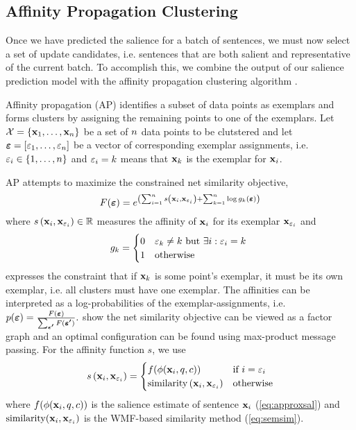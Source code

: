 \subsection{Affinity Propagation Clustering}
\label{sec:exsel}

Once we have predicted the salience for a batch of sentences, we must now
select a set of update candidates, i.e. sentences that are both salient and
representative of the current batch. To accomplish this, we combine the output
of our salience prediction model with the affinity propagation clustering
algorithm \citep{frey2007clustering}.

Affinity propagation (AP)  identifies a subset of data points as exemplars and
forms clusters by assigning the remaining points to one of the exemplars.  Let
$\mathcal{X} = \left\{\mathbf{x}_1,\ldots,\mathbf{x}_{n} \right\}$
be a set of $n$ data points to be clutstered and let $\boldsymbol{\varepsilon} =
\left[\varepsilon_1,\ldots, \varepsilon_{n} \right]$ be a vector of
corresponding exemplar assignments, i.e. $\varepsilon_i \in \{1,\ldots,
n\}$ and $\varepsilon_i = k$ means that $\mathbf{x}_k$ is the
exemplar for $\mathbf{x}_i$.

AP attempts to maximize the constrained net similarity 
objective,
\[ F(\mathbf{\boldsymbol{\varepsilon}}) = e^{\left(\sum_{i=1}^{n} s\left(\mathbf{x}_i,\mathbf{x}_{\varepsilon_i}\right) + \sum_{k=1}^{n} \log g_k(\mathbf{\boldsymbol{\varepsilon}}) \right)}
\]
where $s\left(\mathbf{x}_i, \mathbf{x}_{\varepsilon_i}\right) \in \mathbb{R}$ measures the 
affinity of $\mathbf{x}_i$ for its exemplar $\mathbf{x}_{\varepsilon_i}$ and 
\[g_k = \begin{cases} 0 & \textrm{$\varepsilon_k \ne k$ but $\exists i: \varepsilon_i = k$ } \\ 1 & \textrm{otherwise}      \end{cases}\] expresses the 
constraint that if $\mathbf{x}_k$ is some point's exemplar, it must be its
own exemplar, i.e. all clusters must have one exemplar. The affinities
can be interpreted as a log-probabilities of the exemplar-assignments, i.e.
$p(\boldsymbol{\varepsilon}) = \frac{F(\boldsymbol{\varepsilon})}{ \sum_{\boldsymbol{\boldsymbol{\varepsilon}^\prime }  } F( \boldsymbol{\boldsymbol{\varepsilon}^\prime }  )  }.$ \cite{frey2007clustering} show the 
net similarity objective can be viewed as a factor graph and an
 optimal configuration can be found using max-product message passing. 
For the affinity function $s$, we use
\[ s\left(\mathbf{x}_i, \mathbf{x}_{\varepsilon_i}\right) = \begin{cases}
 f(\phi(\mathbf{x}_i,q,c))   & \textrm{if $i = \varepsilon_i$ }\\
 \operatorname{similarity}\left(\mathbf{x}_i,\mathbf{x}_{\varepsilon_i}\right)    & \textrm{otherwise}
\end{cases}
\]
where $f(\phi(\mathbf{x}_i,q,c))$ is the salience estimate of
sentence $\mathbf{x}_i$ (\autoref{eq:approxsal}) and $\operatorname{similarity}(\mathbf{x}_i, \mathbf{x}_{\varepsilon_i})$ is the WMF-based similarity
method (\autoref{eq:semsim}).







